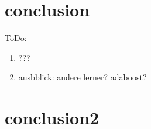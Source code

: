 
\chapter{conclusion}\label{conclusion}

ToDo:
\begin{enumerate}[nosep]
    \item ???
    \item ausbblick: andere lerner? adaboost?
\end{enumerate}


\chapter{conclusion2}
